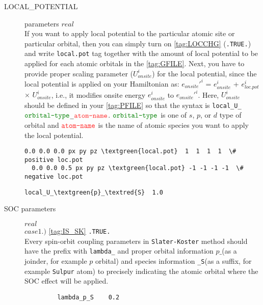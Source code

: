 \documentclass[a4paper,12pt]{scrartcl}
\makeatletter
\def\namedlabel#1#2{\begingroup
    #2%
    \def\@currentlabel{#2}%
    \phantomsection\label{#1}\endgroup
}
\newcommand{\textred}[1]{\textcolor{red!85!white}{\texttt{#1}}}
\newcommand{\textgreen}[1]{\textcolor{green!50!black}{\texttt{#1}}}
\makeatother
\begin{document}
\begin{description}
\begin{Verbatim}[commandchars=\\\{\},gobble=4, frame=single, framesep=2mm, 
    label= source code example: get\_cc\_param.f90,
    labelposition=bottomline]
\end{Verbatim}
		
    \item[\namedlabel{tag:param-locpot}{LOCAL\_POTENTIAL}] parameters $real$ \\
		If you want to apply local potential to the particular atomic site or
		particular orbital, then you can simply turn on \ref{tag:LOCCHG}
		(\texttt{.TRUE.}) and write \texttt{local.pot} tag together with the amount of
		local potential to be applied for each atomic orbitals in the \ref{tag:GFILE}.
		Next, you have to provide proper scaling parameter ($U_{onsite}^i$) for the local 
		potential, since the local potential is applied on your Hamiltonian
		as: $e_{onsite}'^i$ = $e_{onsite}^i$ + $e_{loc.pot}^i$ $\times$ $U_{onsite}^i$,
		i.e., it modifies onsite energy $e_{onsite}^i$ to $e_{onsite}'^i$.
		Here, $U_{onsite}^i$ should be defined in your \ref{tag:PFILE} so that
		the syntax is \texttt{local\_U\_$\textgreen{orbital-type}$\_$\textred{atom-name}$}.
		$\textgreen{orbital-type}$ is one of $s$, $p$, or $d$ type of orbital and 
		$\textred{atom-name}$ is the name of atomic species you want to apply the local
		potential.
\begin{Verbatim}[commandchars=\\\{\},gobble=4, frame=single, framesep=2mm, 
    label= example of \textgreen{local.pot} tag in \ref{tag:GFILE},
    labelposition=bottomline]
  0.0 0.0 0.0 px py pz \textgreen{local.pot}  1  1  1  1  \# positive loc.pot
  0.0 0.0 0.5 px py pz \textgreen{local.pot} -1 -1 -1 -1  \# negative loc.pot

\end{Verbatim}
\begin{Verbatim}[commandchars=\\\{\},gobble=4, frame=single, framesep=2mm, 
    label= example of \textgreen{local.pot} parameter  in \ref{tag:PFILE},
    labelposition=bottomline]
    local_U_\textgreen{p}_\textred{S}  1.0
\end{Verbatim}



    \item[\namedlabel{tag:param-soc}{SOC parameters}] $real$ \\
		\subitem $case 1.)$ \ref{tag:IS_SK} \texttt{.TRUE.} \\
       	Every spin-orbit coupling parameters in \texttt{Slater-Koster} method
		should have the prefix with \texttt{lambda\_} and proper orbital information 
		\texttt{$p\_$}(as a joinder, for example $p$ orbital) 
		and species information \texttt{\_S}(as a suffix, for example 
		\texttt{Sulpur} atom) to precisely indicating the 
		atomic orbital where the SOC effect will be applied.
        \begin{verbatim}
         lambda_p_S    0.2
        \end{verbatim}


\end{description}
\end{document}
